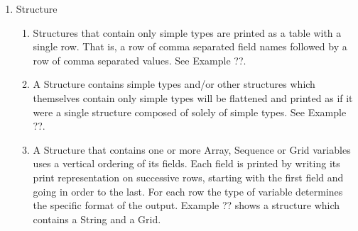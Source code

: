 \documentclass{article}
\begin{document}
\begin{enumerate}
\T\begin{minipage}{5in}
Example :
\T\medskip

\begin{vcode}{it}
Dataset {
  Grid {
    Array: 
      Byte temp[t=4][lat=5][lon=5];
    Maps:
      Int32 t[4];
      Float64 lat[5];
      Float64 lon[5];
  } v;
} ex16;
\end{vcode}
\T\medskip

Output:\\
\begin{ttfamily}
Dataset: $dataset name$\\
v.lon, $v.lon[0]$, \ldots, $v.lon[4]$\\
v.temp[v.t=$v.t[0]$][v.lat=$v.lat[0]$], $temp[0][0][0]$, \ldots, $temp[0][0][4]$\\
\vdots\\
v.temp[v.t=$v.t[0]$][v.lat=$v.lat[4]$], $temp[0][4][0]$, \ldots, $temp[0][4][4]$\\
\vdots\\
v.temp[v.t=$v.t[3]$][v.lat=$v.lat[0]$], $temp[3][0][0]$, \ldots, $temp[3][0][4]$\\
\vdots\\
v.temp[v.t=$v.t[3]$][v.lat=$v.lat[4]$], $temp[3][4][0]$, \ldots, $temp[3][4][4]$\\
\end{ttfamily}
\T\end{minipage}
\T\bigskip

\item Structure
\begin{enumerate}
\item Structures that contain only simple types are printed as a table with a
  single row. That is, a row of comma separated field names followed by a row
  of comma separated values. See Example ??.
\item A Structure contains simple types and/or other structures which
  themselves contain only simple types will be flattened and printed as if it
  were a single structure composed of solely of simple types. See Example ??.
\item A Structure that contains one or more Array, Sequence or Grid variables
  uses a vertical ordering of its fields. Each field is printed by writing
  its print representation on successive rows, starting with the first field
  and going in order to the last. For each row the type of variable
  determines the specific format of the output. Example ?? shows a structure
  which contains a String and a Grid.
\end{enumerate}


\end{enumerate}
\end{document}
